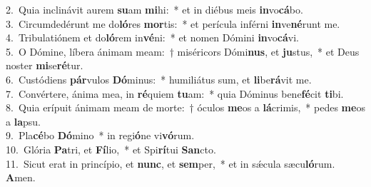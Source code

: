 {2.~}Quia inclinávit aurem \textbf{su}am \textbf{mi}hi:~* et in diébus meis \textbf{in}vo\textbf{cá}bo.\\
{3.~}Circumdedérunt me do\textbf{ló}res \textbf{mor}tis:~* et perícula inférni \textbf{in}ve\textbf{né}runt me.\\
{4.~}Tribulatiónem et do\textbf{ló}rem in\textbf{vé}ni:~* et nomen Dómini \textbf{in}vo\textbf{cá}vi.\\
{5.~}O Dómine, líbera ánimam meam:~† miséricors Dómi\textbf{nus}, et \textbf{ju}stus,~* et Deus noster \textbf{mi}se\textbf{ré}tur.\\
{6.~}Custódiens \textbf{pár}vulos \textbf{Dó}minus:~* humiliátus sum, et \textbf{li}be\textbf{rá}vit me.\\
{7.~}Convértere, ánima mea, in \textbf{ré}quiem \textbf{tu}am:~* quia Dóminus bene\textbf{fé}cit \textbf{ti}bi.\\
{8.~}Quia erípuit ánimam meam de morte:~† óculos \textbf{me}os a \textbf{lá}crimis,~* pedes \textbf{me}os a \textbf{la}psu.\\
{9.~}Pla\textbf{cé}bo \textbf{Dó}mino~* in regi\textbf{ó}ne vi\textbf{vó}rum.\\
{10.~}Glória \textbf{Pa}tri, et \textbf{Fí}lio,~* et Spi\textbf{rí}tui \textbf{San}cto.\\
{11.~}Sicut erat in princípio, et \textbf{nunc}, et \textbf{sem}per,~* et in sǽcula sæcu\textbf{ló}rum. \textbf{A}men.\\
